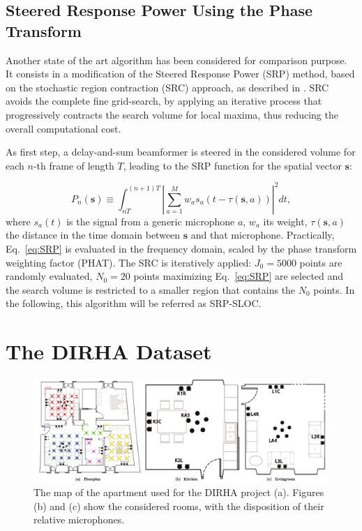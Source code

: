 \documentclass[review]{elsarticle}
\let\originaleqref=\eqref
\renewcommand{\eqref}{Eq.~\originaleqref}
\begin{document}
\subsection{Steered Response Power Using the Phase Transform}
Another state of the art algorithm has been considered for comparison purpose. It consists in a modification of the Steered Response Power (SRP) method, based on the stochastic region contraction (SRC) approach, as described in \cite{DoSY07}. SRC avoids the complete fine grid-search, by applying an iterative process that progressively contracts the search volume for local maxima, thus reducing the overall computational cost.

As first step, a delay-and-sum beamformer is steered in the considered volume for each $n$-th frame of length $T$, leading to the SRP function for the spatial vector $\mathbf{s}$:

\begin{equation}
\label{eq:SRP}
P_n(\mathbf{s}) \equiv \int_{nT}^{(n+1)T} \left| \sum_{a=1}^M w_a s_a (t -\tau (\mathbf{s},a))\right|^2 dt,
\end{equation}
where $s_a(t)$ is the signal from a generic microphone $a$, $w_a$ its weight, $\tau (\mathbf{s},a)$ the distance in the time domain between $\mathbf{s}$ and that microphone. Practically, \eqref{eq:SRP} is evaluated in the frequency domain, scaled by the phase transform weighting factor (PHAT). The SRC is iteratively applied: $J_0 = 5000$ points are randomly evaluated, $N_0 = 20$ points maximizing \eqref{eq:SRP} are selected and the search volume is restricted to a smaller region that contains the $N_0$ points.
In the following, this algorithm will be referred as SRP-SLOC.



\section{The DIRHA Dataset}
\label{sec:dataset}

\begin{figure}[h]
	\centering
	\includegraphics[width=\textwidth]{imgs/plan}
	\caption{The map of the apartment used for the DIRHA project (a). Figures (b) and (c) show the considered rooms, with the disposition of their relative microphones. }
	\label{fig:DIRHA_map}
\end{figure}
\end{document}
